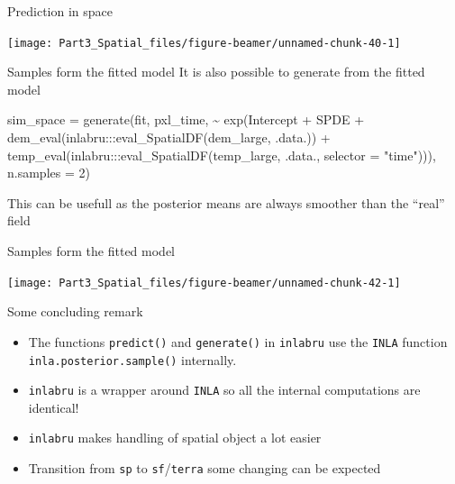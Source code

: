 \documentclass[
  ignorenonframetext,
]{beamer}
\newenvironment{Shaded}{\begin{snugshade}}{\end{snugshade}}
\newcommand{\AttributeTok}[1]{\textcolor[rgb]{0.77,0.63,0.00}{#1}}
\newcommand{\DecValTok}[1]{\textcolor[rgb]{0.00,0.00,0.81}{#1}}
\newcommand{\FunctionTok}[1]{\textcolor[rgb]{0.00,0.00,0.00}{#1}}
\newcommand{\NormalTok}[1]{#1}
\newcommand{\OtherTok}[1]{\textcolor[rgb]{0.56,0.35,0.01}{#1}}
\newcommand{\SpecialCharTok}[1]{\textcolor[rgb]{0.00,0.00,0.00}{#1}}
\newcommand{\StringTok}[1]{\textcolor[rgb]{0.31,0.60,0.02}{#1}}
\begin{document}
\begin{frame}{Prediction in space}
\protect\hypertarget{prediction-in-space-1}{}
\begin{center}\texttt{[image: Part3\_Spatial\_files/figure-beamer/unnamed-chunk-40-1]} \end{center}
\end{frame}

\begin{frame}[fragile]{Samples form the fitted model}
\protect\hypertarget{samples-form-the-fitted-model}{}
It is also possible to generate from the fitted model \tiny

\begin{Shaded}
\begin{Highlighting}[]
\NormalTok{sim\_space }\OtherTok{=} \FunctionTok{generate}\NormalTok{(fit, pxl\_time, }
                      \SpecialCharTok{\textasciitilde{}} \FunctionTok{exp}\NormalTok{(Intercept }\SpecialCharTok{+}\NormalTok{ SPDE }\SpecialCharTok{+}
                       \FunctionTok{dem\_eval}\NormalTok{(inlabru}\SpecialCharTok{:::}\FunctionTok{eval\_SpatialDF}\NormalTok{(dem\_large,}
\NormalTok{                                                         .data.)) }\SpecialCharTok{+}
                       \FunctionTok{temp\_eval}\NormalTok{(inlabru}\SpecialCharTok{:::}\FunctionTok{eval\_SpatialDF}\NormalTok{(temp\_large,}
\NormalTok{                                                          .data.,}
                                                          \AttributeTok{selector =} \StringTok{"time"}\NormalTok{))),}
                     \AttributeTok{n.samples =} \DecValTok{2}\NormalTok{)}
\end{Highlighting}
\end{Shaded}

\normalsize

This can be usefull as the posterior means are always smoother than the
``real'' field
\end{frame}

\begin{frame}{Samples form the fitted model}
\protect\hypertarget{samples-form-the-fitted-model-1}{}
\begin{center}\texttt{[image: Part3\_Spatial\_files/figure-beamer/unnamed-chunk-42-1]} \end{center}
\end{frame}

\begin{frame}[fragile]{Some concluding remark}
\protect\hypertarget{some-concluding-remark}{}
\begin{itemize}
\item
  The functions \texttt{predict()} and \texttt{generate()} in
  \texttt{inlabru} use the \texttt{INLA} function
  \texttt{inla.posterior.sample()} internally.
\item
  \texttt{inlabru} is a wrapper around \texttt{INLA} so all the internal
  computations are identical!
\item
  \texttt{inlabru} makes handling of spatial object a lot easier
\item
  Transition from \texttt{sp} to \texttt{sf}/\texttt{terra} some
  changing can be expected
\end{itemize}
\end{frame}
\end{document}
